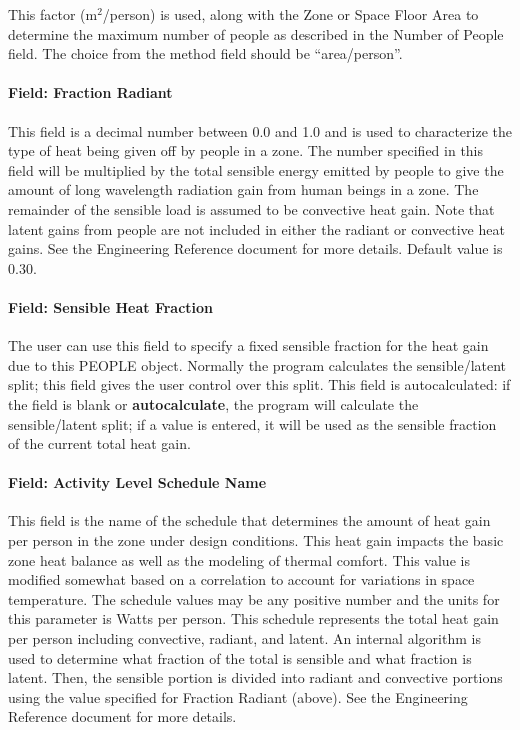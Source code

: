 This factor (m\(^{2}\)/person) is used, along with the Zone or Space Floor Area to determine the maximum number of people as described in the Number of People field. The choice from the method field should be ``area/person''.

\paragraph{Field: Fraction Radiant}\label{field-fraction-radiant}

This field is a decimal number between 0.0 and 1.0 and is used to characterize the type of heat being given off by people in a zone. The number specified in this field will be multiplied by the total sensible energy emitted by people to give the amount of long wavelength radiation gain from human beings in a zone. The remainder of the sensible load is assumed to be convective heat gain. Note that latent gains from people are not included in either the radiant or convective heat gains. See the Engineering Reference document for more details. Default value is 0.30.

\paragraph{Field: Sensible Heat Fraction}\label{field-sensible-heat-fraction}

The user can use this field to specify a fixed sensible fraction for the heat gain due to this PEOPLE object. Normally the program calculates the sensible/latent split; this field gives the user control over this split. This field is autocalculated: if the field is blank or \textbf{autocalculate}, the program will calculate the sensible/latent split; if a value is entered, it will be used as the sensible fraction of the current total heat gain.

\paragraph{Field: Activity Level Schedule Name}\label{field-activity-level-schedule-name}

This field is the name of the schedule that determines the amount of heat gain per person in the zone under design conditions. This heat gain impacts the basic zone heat balance as well as the modeling of thermal comfort. This value is modified somewhat based on a correlation to account for variations in space temperature. The schedule values may be any positive number and the units for this parameter is Watts per person. This schedule represents the total heat gain per person including convective, radiant, and latent. An internal algorithm is used to determine what fraction of the total is sensible and what fraction is latent. Then, the sensible portion is divided into radiant and convective portions using the value specified for Fraction Radiant (above). See the Engineering Reference document for more details.

